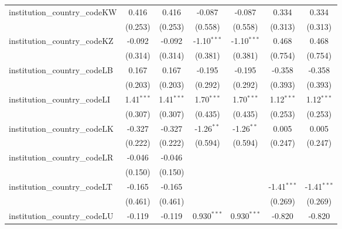 \begin{tabular}{lcccccc}
   institution\_country\_codeKW          & 0.416          & 0.416          & -0.087         & -0.087         & 0.334          & 0.334\\   
                                         & (0.253)        & (0.253)        & (0.558)        & (0.558)        & (0.313)        & (0.313)\\   
   institution\_country\_codeKZ          & -0.092         & -0.092         & -1.10$^{***}$  & -1.10$^{***}$  & 0.468          & 0.468\\   
                                         & (0.314)        & (0.314)        & (0.381)        & (0.381)        & (0.754)        & (0.754)\\   
   institution\_country\_codeLB          & 0.167          & 0.167          & -0.195         & -0.195         & -0.358         & -0.358\\   
                                         & (0.203)        & (0.203)        & (0.292)        & (0.292)        & (0.393)        & (0.393)\\   
   institution\_country\_codeLI          & 1.41$^{***}$   & 1.41$^{***}$   & 1.70$^{***}$   & 1.70$^{***}$   & 1.12$^{***}$   & 1.12$^{***}$\\   
                                         & (0.307)        & (0.307)        & (0.435)        & (0.435)        & (0.253)        & (0.253)\\   
   institution\_country\_codeLK          & -0.327         & -0.327         & -1.26$^{**}$   & -1.26$^{**}$   & 0.005          & 0.005\\   
                                         & (0.222)        & (0.222)        & (0.594)        & (0.594)        & (0.247)        & (0.247)\\   
   institution\_country\_codeLR          & -0.046         & -0.046         &                &                &                &   \\   
                                         & (0.150)        & (0.150)        &                &                &                &   \\   
   institution\_country\_codeLT          & -0.165         & -0.165         &                &                & -1.41$^{***}$  & -1.41$^{***}$\\   
                                         & (0.461)        & (0.461)        &                &                & (0.269)        & (0.269)\\   
   institution\_country\_codeLU          & -0.119         & -0.119         & 0.930$^{***}$  & 0.930$^{***}$  & -0.820         & -0.820\\   

\end{tabular}
